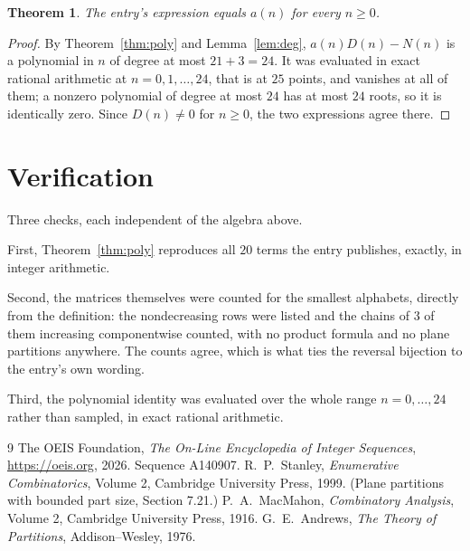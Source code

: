 \documentclass[11pt,a4paper]{article}
\theoremstyle{plain}
\newtheorem{theorem}{Theorem}
\theoremstyle{definition}
\begin{document}
\begin{theorem}
The entry's expression equals $a(n)$ for every $n\ge0$.
\end{theorem}

\begin{proof}
By Theorem~\ref{thm:poly} and Lemma~\ref{lem:deg}, $a(n)D(n)-N(n)$ is a polynomial in $n$
of degree at most $21+3=24$. It was evaluated in exact rational arithmetic at
$n=0,1,\dots,24$, that is at $25$ points, and vanishes at all of them; a nonzero polynomial
of degree at most $24$ has at most $24$ roots, so it is identically zero. Since $D(n)\neq0$
for $n\ge0$, the two expressions agree there.
\end{proof}

\section{Verification}

Three checks, each independent of the algebra above.

First, Theorem~\ref{thm:poly} reproduces all $20$ terms the entry publishes,
exactly, in integer arithmetic.

Second, the matrices themselves were counted for the smallest alphabets, directly from the
definition: the nondecreasing rows were listed and the chains of $3$ of them increasing
componentwise counted, with no product formula and no plane partitions anywhere. The counts
agree, which is what ties the reversal bijection to the entry's own wording.

Third, the polynomial identity was evaluated over the whole range $n=0,\dots,24$ rather than
sampled, in exact rational arithmetic.

\begin{thebibliography}{9}
 The OEIS Foundation, \emph{The On-Line Encyclopedia of Integer
Sequences}, \url{https://oeis.org}, 2026. Sequence A140907.
 R.~P.~Stanley, \emph{Enumerative Combinatorics}, Volume 2, Cambridge
University Press, 1999. (Plane partitions with bounded part size, Section 7.21.)
 P.~A.~MacMahon, \emph{Combinatory Analysis}, Volume 2, Cambridge
University Press, 1916.
 G.~E.~Andrews, \emph{The Theory of Partitions}, Addison--Wesley, 1976.
\end{thebibliography}
\end{document}
